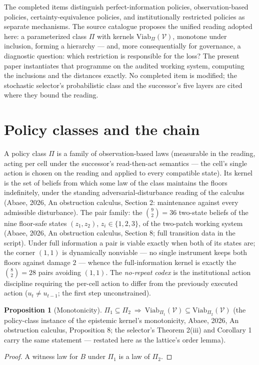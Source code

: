 \documentclass[10pt,twocolumn]{article}
\theoremstyle{definition}
\newtheorem{proposition}{Proposition}
\begin{document}
The completed items distinguish perfect-information policies,
observation-based policies, certainty-equivalence policies, and
institutionally restricted policies as separate mechanisms. The source
catalogue proposes the unified reading adopted here: a parameterized class
$\Pi$ with kernels $\mathrm{Viab}_\Pi(\mathcal V)$, monotone under
inclusion, forming a hierarchy --- and, more consequentially for
governance, a diagnostic question: which restriction is responsible for the
loss? The present paper instantiates that programme on the audited working
system, computing the inclusions and the distances exactly. No completed
item is modified; the stochastic selector's probabilistic class and the
successor's five layers are cited where they bound the reading.

\section{Policy classes and the chain}

A policy class $\Pi$ is a family of observation-based laws (measurable in
the reading, acting per cell under the successor's read-then-act
semantics --- the cell's single action is chosen on the reading and applied
to every compatible state). Its kernel is the set of beliefs from which
some law of the class maintains the floors indefinitely, under the
standing adversarial-disturbance reading of the calculus (Abaee, 2026, An obstruction calculus,
Section 2: maintenance against every admissible disturbance). The pair
family: the $\binom{9}{2}=36$ two-state beliefs of the nine floor-safe
states $(z_1,z_2)$, $z_i\in\{1,2,3\}$, of the two-patch working system
(Abaee, 2026, An obstruction calculus, Section 8; full transition data in the script). Under full
information a pair is viable exactly when both of its states are; the
corner $(1,1)$ is dynamically nonviable --- no single instrument keeps
both floors against damage $2$ --- whence the full-information kernel is
exactly the $\binom{8}{2}=28$ pairs avoiding $(1,1)$. The
\emph{no-repeat codex} is the institutional action discipline requiring
the per-cell action to differ from the previously executed action
($u_t\neq u_{t-1}$; the first step unconstrained).

\begin{proposition}[Monotonicity]
$\Pi_1\subseteq\Pi_2\ \Longrightarrow\
\mathrm{Viab}_{\Pi_1}(\mathcal V)\subseteq
\mathrm{Viab}_{\Pi_2}(\mathcal V)$
(the policy-class instance of the epistemic kernel's monotonicity, Abaee, 2026, An obstruction calculus, Proposition 8; the selector's Theorem 2(iii) and Corollary 1 carry
the same statement --- restated here as the lattice's order lemma).
\end{proposition}
\begin{proof}
A witness law for $B$ under $\Pi_1$ is a law of $\Pi_2$.
\end{proof}
\end{document}
